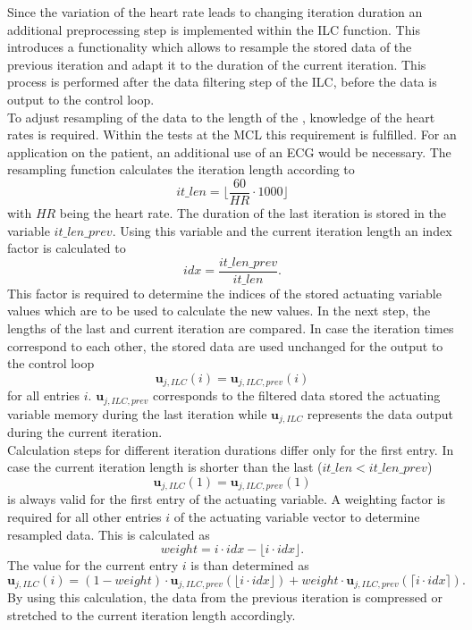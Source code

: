 Since the variation of the heart rate leads to changing iteration duration an additional preprocessing step is implemented within the ILC function. This introduces a functionality which allows to resample the stored data of the previous iteration and adapt it to the duration of the current iteration. This process is performed after the data filtering step of the ILC, before the data is output to the control loop.
\\To adjust resampling of the data to the length of the , knowledge of the heart rates is required. Within the tests at the MCL this requirement is fulfilled. For an application on the patient, an additional use of an ECG would be necessary.
The resampling function calculates the iteration length according to
\begin{equation}
  it\_len = \lfloor\frac{60}{HR}\cdot1000\rfloor
\end{equation}
with $HR$ being the heart rate. The duration of the last iteration is stored in the variable $it\_len\_prev$. Using this variable and the current iteration length an index factor is calculated to
\begin{equation}
  idx = \frac{it\_len\_prev}{it\_len}.
\end{equation}
This factor is required to determine the indices of the stored actuating variable values which are to be used to calculate the new values.
In the next step, the lengths of the last and current iteration are compared. In case the iteration times correspond to each other, the stored data are used unchanged for the output to the control loop
\begin{equation}
  \mathbf{u}_{j,ILC}(i) = \mathbf{u}_{j,ILC,prev}(i)
\end{equation} for all entries $i$. $\mathbf{u}_{j,ILC,prev}$ corresponds to the filtered data stored the actuating variable memory during the last iteration while $\mathbf{u}_{j,ILC}$ represents the data output during the current iteration.
\\Calculation steps for different iteration durations differ only for the first entry. In case the current iteration length is shorter than the last ($it\_len<it\_len\_prev$)
\begin{equation}
  \mathbf{u}_{j,ILC}(1) = \mathbf{u}_{j,ILC,prev}(1)
\end{equation} is always valid for the first entry of the actuating variable.
A weighting factor is required for all other entries $i$ of the actuating variable vector to determine resampled data. This is calculated as
\begin{equation}
  weight= i \cdot idx - \lfloor i \cdot idx\rfloor.
\end{equation}
The value for the current entry $i$ is than determined as
\begin{equation}
  \mathbf{u}_{j,ILC}(i) = (1-weight) \cdot \mathbf{u}_{j,ILC,prev}(\lfloor i \cdot idx\rfloor) + weight\cdot \mathbf{u}_{j,ILC,prev}(\lceil i \cdot idx\rceil).
\end{equation}
By using this calculation, the data from the previous iteration is compressed or stretched to the current iteration length accordingly.

